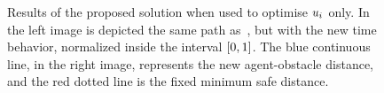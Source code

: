 \begin{figure}[!t]
\begin{center}
\begin{minipage}{.45\linewidth}
		\end{minipage}
	\end{center}
	\caption{Results of the proposed solution when used to optimise $u_i$ only.
    In the left image is depicted the same path as~, but with the new time behavior,
    normalized inside the interval $\left[ 0,1 \right]$. The blue continuous line, in the right image, represents
    the new agent-obstacle distance, and the red dotted line is the fixed minimum safe distance.}%
    \label{FIG:ST-BEZIER-3D-U-RESULT}
\end{figure}
\begin{figure}[!t]
	\begin{center}
		\begin{minipage}{.45\linewidth}
			\centering
		\end{minipage}
		\begin{minipage}{.45\linewidth}
			\centering

\end{minipage}
\end{center}
\end{figure}

